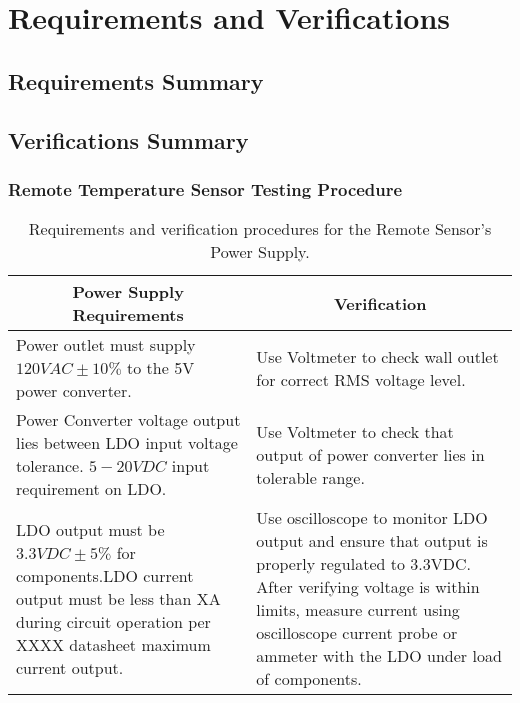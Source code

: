 \section{Requirements and Verifications}
\subsection{Requirements Summary}
\subsection{Verifications Summary}
\subsubsection{Remote Temperature Sensor Testing Procedure}
\begin{table}[htbp]
\begin{tabular}{|p{}|p{}|}
\hline
\multicolumn{1}{|c|}{Power Supply Requirements} & \multicolumn{1}{|c|}{Verification} \\
\hline\hline
Power outlet must supply $120VAC \pm 10\%$ to the 5V power converter. & Use Voltmeter to check wall outlet for correct RMS voltage level.\\
\hline
Power Converter voltage output lies between LDO input voltage tolerance. $5-20VDC$ input requirement on LDO. & Use Voltmeter to check that output of power converter lies in tolerable range.\\
\hline
LDO output must be $3.3VDC \pm 5\%$ for components.\newline LDO current output must be less than XA during circuit operation per XXXX datasheet maximum current output. & Use oscilloscope to monitor LDO output and ensure that output is properly regulated to 3.3VDC.  After verifying voltage is within limits, measure current using oscilloscope current probe or ammeter with the LDO under load of components.\\
\hline
\end{tabular}
\caption{Requirements and verification procedures for the Remote Sensor's Power Supply.}
\label{tab:powersupplyreq}
\end{table}

